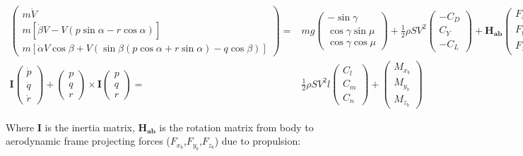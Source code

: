 \begin{align}
	\begin{pmatrix}
	m \dot{V} \\
	m\left[ \dot{\beta}V -V(p\sin\alpha - r\cos\alpha) \right]\\
	m\left[ \dot{\alpha} V \cos\beta + V\left(\sin\beta (p\cos\alpha + r\sin\alpha) - q\cos\beta\right)\right]
	\end{pmatrix}
	= & mg
	\begin{pmatrix}
	-\sin\gamma\\
	\cos\gamma \sin\mu\\
	\cos\gamma \cos\mu	
	\end{pmatrix}
	+ \frac{1}{2} \rho S V^2
	\begin{pmatrix}
	-C_D\\
	C_Y\\
	-C_L
	\end{pmatrix}
	+ \mathbf{H_{ab}} 
	\begin{pmatrix}
	F_{x_b}\\
	F_{y_b}\\
	F_{z_b}
	\end{pmatrix} \label{E:Sdtdebut}\\
	\textbf{I}
	\begin{pmatrix}
	\dot{p}\\
	\dot{q}\\
	\dot{r}
	\end{pmatrix}
	 + \begin{pmatrix}
	 p\\
	 q\\
	 r
	 \end{pmatrix} \times \textbf{I}
	 \begin{pmatrix}
	 p\\
	 q\\
	 r
	 \end{pmatrix}
 	 =& \frac{1}{2} \rho S V^2 l
	\begin{pmatrix}
	C_l\\
	C_m\\
	C_n
	\end{pmatrix}
	+
	\begin{pmatrix}
	M_{x_b}\\
	M_{y_b}\\
	M_{z_b}
	\end{pmatrix} \label{E:sdtMoments}
\end{align}

Where \textbf{I} is the inertia matrix, $\mathbf{H_{ab}}$ is the rotation matrix from body to aerodynamic frame projecting forces ($F_{x_b}$,$F_{y_b}$,$F_{z_b}$) due to propulsion:

